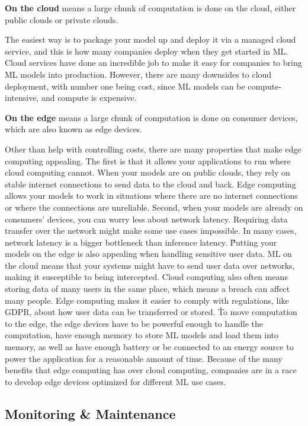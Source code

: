 \textbf{On the cloud} means a large chunk of computation is done on the cloud, either public clouds or private clouds.
\ed

The easiest way is to package your model up and deploy it via a managed cloud service, and this is how many companies
deploy when they get started in ML. Cloud services have done an incredible job to make it easy for companies to bring
ML models into production. However, there are many downsides to cloud deployment, with number one being cost, since
ML models can be compute-intensive, and compute is expensive.

\textbf{On the edge} means a large chunk of computation is done on consumer devices, which are also known as edge
devices.
\ed

Other than help with controlling costs, there are many properties that make edge computing appealing. The first is
that it allows your applications to run where cloud computing cannot. When your models are on public clouds, they
rely on stable internet connections to send data to the cloud and back. Edge computing allows your models to work in
situations where there are no internet connections or where the connections are unreliable. Second, when your models
are already on consumers' devices, you can worry less about network latency. Requiring data transfer over the network
might make some use cases impossible. In many cases, network latency is a bigger bottleneck than inference latency. \v

Putting your models on the edge is also appealing when handling sensitive user data. ML on the cloud means that your
systems might have to send user data over networks, making it susceptible to being intercepted. Cloud computing also
often means storing data of many users in the same place, which means a breach can affect many people. Edge computing
makes it easier to comply with regulations, like GDPR, about how user data can be transferred or stored. \v

To move computation to the edge, the edge devices have to be powerful enough to handle the computation, have enough
memory to store ML models and load them into memory, as well as have enough battery or be connected to an energy
source to power the application for a reasonable amount of time. Because of the many benefits that edge computing has
over cloud computing, companies are in a race to develop edge devices optimized for different ML use
cases.

\subsection{Monitoring \& Maintenance}

